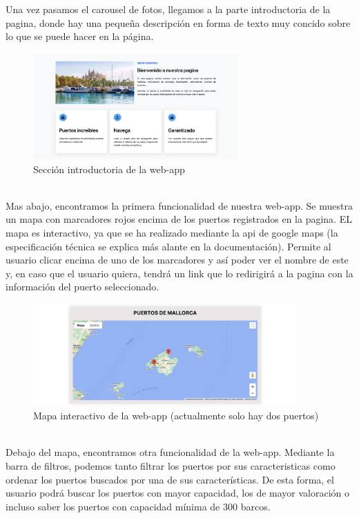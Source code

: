 \documentclass{article}
\begin{document}
\noindent Una vez pasamos el carousel de fotos, llegamos a la parte introductoria de la pagina, donde hay una pequeña descripción en forma de texto muy concido sobre lo que se puede hacer en la página.
\begin{figure}[ht]
    \centering
    \includegraphics[width=0.7\textwidth]{images/introduccion.png}
    \caption{Sección introductoria de la web-app}
\end{figure}
\\Mas abajo, encontramos la primera funcionalidad de nuestra web-app. Se muestra un mapa con marcadores rojos encima de los puertos registrados en la pagina. EL mapa es interactivo, ya que se ha realizado mediante la api de google maps (la especificación técnica se explica más alante en la documentación). Permite al usuario clicar encima de uno de los marcadores y así poder ver el nombre de este y, en caso que el usuario quiera, tendrá un link que lo redirigirá a la pagina con la información del puerto seleccionado.
\begin{figure}[ht]
    \centering
    \includegraphics[width=0.9\textwidth]{images/mapa.png}
    \caption{Mapa interactivo de la web-app (actualmente solo hay dos puertos)}
\end{figure}
\\Debajo del mapa, encontramos otra funcionalidad de la web-app. Mediante la barra de filtros, podemos tanto filtrar los puertos por sus caracteristicas como ordenar los puertos buscados por una de sus características. De esta forma, el usuario podrá buscar los puertos con mayor capacidad, los de mayor valoración o incluso saber los puertos con capacidad mínima de 300 barcos. 
\end{document}
